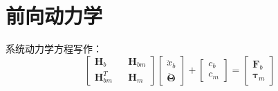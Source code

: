 \documentclass[UTF8]{ctexart}
\begin{document}
\section{前向动力学}
系统动力学方程写作：
\begin{equation*}
	\left[\begin{matrix}
	\boldsymbol{H}_{b} && \boldsymbol{H}_{bm}\\
	\boldsymbol{H}_{bm}^{T} && \boldsymbol{H}_{m}
	\end{matrix}\right]\left[\begin{matrix}
	\ddot{x}_{b}\\
	\ddot{\boldsymbol{\Theta}}
	\end{matrix}\right]+\left[\begin{matrix}
	c_{b}\\
	c_{m}
	\end{matrix}\right]=\left[\begin{matrix}
	\boldsymbol{F}_{b}\\
	\boldsymbol{\tau}_{m}
	\end{matrix}\right]
\end{equation*}
\end{document}
